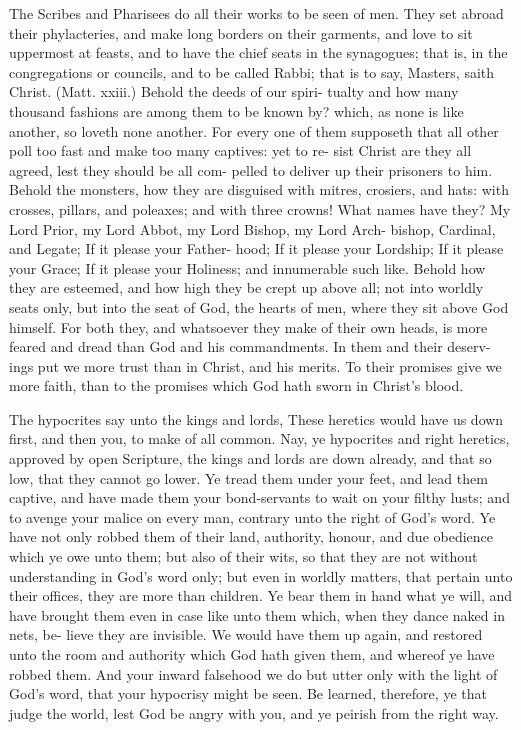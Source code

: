 \documentclass{custom}
\begin{document}
The Scribes and Pharisees do all their works to be 
seen of men. They set abroad their phylacteries, and 
make long borders on their garments, and love to sit 
uppermost at feasts, and to have the chief seats in the 
synagogues; that is, in the congregations or councils, 
and to be called Rabbi; that is to say, Masters, saith 
Christ. (Matt. xxiii.) Behold the deeds of our spiri- 
tualty and how many thousand fashions are among them 
to be known by? which, as none is like another, so loveth 
none another. For every one of them supposeth that all 
other poll too fast and make too many captives: yet to re- 
sist Christ are they all agreed, lest they should be all com- 
pelled to deliver up their prisoners to him. Behold the 
monsters, how they are disguised with mitres, crosiers, 
and hats: with crosses, pillars, and poleaxes; and with 
three crowns! What names have they? My Lord 
Prior, my Lord Abbot, my Lord Bishop, my Lord Arch- 
bishop, Cardinal, and Legate; If it please your Father- 
hood; If it please your Lordship; If it please your 
Grace; If it please your Holiness; and innumerable 
such like. Behold how they are esteemed, and how high 
they be crept up above all; not into worldly seats only, but 
into the seat of God, the hearts of men, where they sit 
above God himself. For both they, and whatsoever they 
make of their own heads, is more feared and dread than 
God and his commandments. In them and their deserv- 
ings put we more trust than in Christ, and his merits. To 
their promises give we more faith, than to the promises 
which God hath sworn in Christ's blood. 

The hypocrites say unto the kings and lords, These 
heretics would have us down first, and then you, to make 
of all common. Nay, ye hypocrites and right heretics, 
approved by open Scripture, the kings and lords are down 
already, and that so low, that they cannot go lower. Ye 
tread them under your feet, and lead them captive, and 
have made them your bond-servants to wait on your 
filthy lusts; and to avenge your malice on every man, 
contrary unto the right of God's word. Ye have not only 
robbed them of their land, authority, honour, and due 
obedience which ye owe unto them; but also of their 
wits, so that they are not without understanding in God's 
word only; but even in worldly matters, that pertain unto 
their offices, they are more than children. Ye bear them 
in hand what ye will, and have brought them even in case 
like unto them which, when they dance naked in nets, be- 
lieve they are invisible. We would have them up again, 
and restored unto the room and authority which God hath 
given them, and whereof ye have robbed them. And your 
inward falsehood we do but utter only with the light of 
God's word, that your hypocrisy might be seen. Be 
learned, therefore, ye that judge the world, lest God be 
angry with you, and ye peirish from the right way. 
\end{document}
